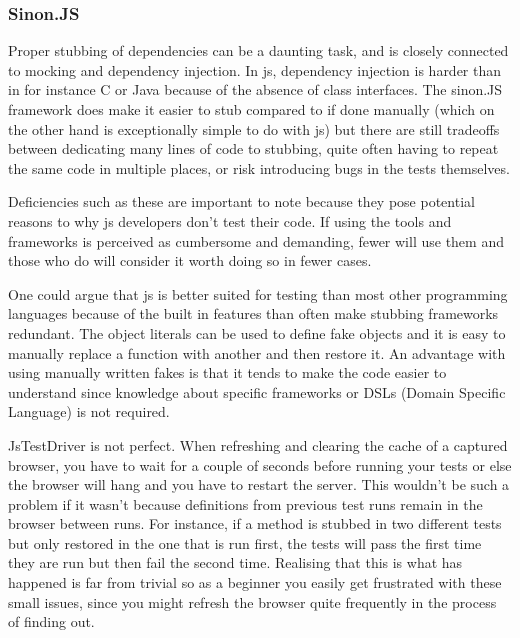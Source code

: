 \documentclass[11pt]{article}
\begin{document}
\subsubsection{Sinon.JS}

Proper stubbing of dependencies can be a daunting task, and is closely connected to mocking and dependency injection. In \gls{js}, dependency injection is harder than in for instance C or Java because of the absence of class interfaces. The sinon.JS framework does make it easier to stub compared to if done manually (which on the other hand is exceptionally simple to do with \gls{js}) but there are still tradeoffs between dedicating many lines of code to stubbing, quite often having to repeat the same code in multiple places, or risk introducing bugs in the tests themselves.

Deficiencies such as these are important to note because they pose potential reasons to why \gls{js} developers don't test their code. If using the tools and frameworks is perceived as cumbersome and demanding, fewer will use them and those who do will consider it worth doing so in fewer cases.

One could argue that \gls{js} is better suited for testing than most other programming languages because of the built in features than often make stubbing frameworks redundant. The object literals can be used to define fake objects and it is easy to manually replace a function with another and then restore it. An advantage with using manually written fakes is that it tends to make the code easier to understand since knowledge about specific frameworks or DSLs (Domain Specific Language) is not required. \cite[questions~20-21]{Edelstam}\label{LiteralFakes}

JsTestDriver is not perfect. When refreshing and clearing the cache of a captured browser, you have to wait for a couple of seconds before running your tests or else the browser will hang and you have to restart the server. This wouldn't be such a problem if it wasn't because definitions from previous test runs remain in the browser between runs. For instance, if a method is stubbed in two different tests but only restored in the one that is run first, the tests will pass the first time they are run but then fail the second time. Realising that this is what has happened is far from trivial so as a beginner you easily get frustrated with these small issues, since you might refresh the browser quite frequently in the process of finding out.
\end{document}

